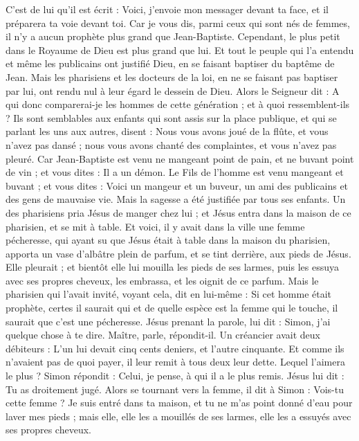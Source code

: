 \begin{multicols}{2}
C'est de lui qu'il est écrit : Voici, j'envoie mon messager devant ta face, et il préparera ta voie devant toi.
Car je vous dis, parmi ceux qui sont nés de femmes, il n'y a aucun prophète plus grand que Jean-Baptiste. Cependant, le plus petit dans le Royaume de Dieu est plus grand que lui.
Et tout le peuple qui l’a entendu et même les publicains ont justifié Dieu, en se faisant baptiser du baptême de Jean.
Mais les pharisiens et les docteurs de la loi, en ne se faisant pas baptiser par lui, ont rendu nul à leur égard le dessein de Dieu.
Alors le Seigneur dit : A qui donc comparerai-je les hommes de cette génération ; et à quoi ressemblent-ils ?
Ils sont semblables aux enfants qui sont assis sur la place publique, et qui se parlant les uns aux autres, disent : Nous vous avons joué de la flûte, et vous n'avez pas dansé ; nous vous avons chanté des complaintes, et vous n'avez pas pleuré.
Car Jean-Baptiste est venu ne mangeant point de pain, et ne buvant point de vin ; et vous dites : Il a un démon.
Le Fils de l'homme est venu mangeant et buvant ; et vous dites : Voici un mangeur et un buveur, un ami des publicains et des gens de mauvaise vie.
Mais la sagesse a été justifiée par tous ses enfants.
Un des pharisiens pria Jésus de manger chez lui ; et Jésus entra dans la maison de ce pharisien, et se mit à table.
Et voici, il y avait dans la ville une femme pécheresse, qui ayant su que Jésus était à table dans la maison du pharisien, apporta un vase d'albâtre plein de parfum,
et se tint derrière, aux pieds de Jésus. Elle pleurait ; et bientôt elle lui mouilla les pieds de ses larmes, puis les essuya avec ses propres cheveux, les embrassa, et les oignit de ce parfum.
Mais le pharisien qui l'avait invité, voyant cela, dit en lui-même : Si cet homme était prophète, certes il saurait qui et de quelle espèce est la femme qui le touche, il saurait que c’est une pécheresse.
Jésus prenant la parole, lui dit : Simon, j'ai quelque chose à te dire. Maître, parle, répondit-il.
Un créancier avait deux débiteurs : L’un lui devait cinq cents deniers, et l'autre cinquante.
Et comme ils n'avaient pas de quoi payer, il leur remit à tous deux leur dette. Lequel l'aimera le plus ?
Simon répondit : Celui, je pense, à qui il a le plus remis. Jésus lui dit : Tu as droitement jugé.
Alors se tournant vers la femme, il dit à Simon : Vois-tu cette femme ? Je suis entré dans ta maison, et tu ne m'as point donné d'eau pour laver mes pieds ; mais elle, elle les a mouillés de ses larmes, elle les a essuyés avec ses propres cheveux.

\end{multicols}
